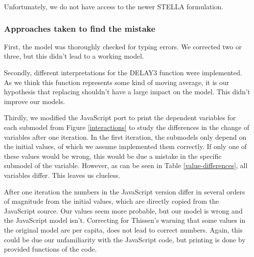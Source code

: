 \documentclass[10pt,a4paper]{scrartcl}
\begin{document}
Unfortunately, we do not have access to the newer STELLA formulation.

\subsubsection*{Approaches taken to find the mistake}

First, the model was thoroughly checked for typing errors. We corrected two or three, but this didn't lead to a working model.

Secondly, different interpretations for the DELAY3 function were implemented. As we think this function represents some kind of moving average, it is our hypothesis that replacing shouldn't have a large impact on the model. This didn't improve our models.

Thirdly, we modified the JavaScript port \cite{blogpost} to print the dependent variables for each submodel from Figure \ref{interactions} to study the differences in the change of variables after one iteration. In the first iteration, the submodels only depend on the initial values, of which we assume implemented them correctly. If only one of these values would be wrong, this would be due a mistake in the specific submodel of the variable. However, as can be seen in Table \ref{value-differences}, all variables differ. This leaves us clueless.

After one iteration the numbers in the JavaScript version differ in several orders of magnitude from the initial values, which are directly copied from the JavaScript source. Our values seem more probable, but our model is wrong and the JavaScript model isn't. Correcting for Thissen's warning that some values in the original model are per capita, does not lead to correct numbers. Again, this could be due our unfamiliarity with the JavaScript code, but printing is done by provided functions of the code.
\end{document}
